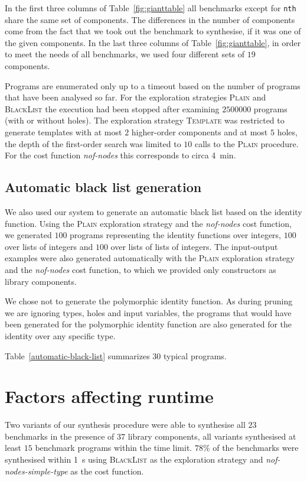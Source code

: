 In the first three columns of Table~\ref{fig:gianttable} all benchmarks except for \lstinline?nth? share the same set of components. The differences in the number of components come from the fact that we took out the benchmark to synthesise, if it was one of the given components.
In the last three columns of Table~\ref{fig:gianttable}, in order to meet the needs of all benchmarks, we used four different sets of $19$ components.

Programs are enumerated only up to a timeout based on the number of programs that have been analysed so far. For the exploration strategies \textsc{Plain} and \textsc{BlackList} the execution had been stopped after examining $2500000$ programs (with or without holes). The exploration strategy \textsc{Template} was restricted to generate templates with at most $2$ higher-order components and at most $5$ holes, the depth of the first-order search was limited to $10$ calls to the \textsc{Plain} procedure. For the cost function \textit{nof-nodes} this corresponds to circa \SI{4}{min}.


\subsection{Automatic black list generation}\label{Black list generation}
We also used our system to generate an automatic black list based on the identity function. Using the \textsc{Plain} exploration strategy and the \textit{nof-nodes} cost function, we generated $100$ programs representing the identity functions over integers, $100$ over lists of integers and $100$ over lists of lists of integers. The input-output examples were also generated automatically with the \textsc{Plain} exploration strategy and the \textit{nof-nodes} cost function, to which we provided only constructors as library components.

We chose not to generate the polymorphic identity function. As during pruning we are ignoring types, holes and input variables, the programs that would have been generated for the polymorphic identity function are also generated for the identity over any specific type.

Table~\ref{automatic-black-list} summarizes $30$ typical programs.


\section{Factors affecting runtime}\label{Factors affecting runtime}
Two variants of our synthesis procedure were able to synthesise all $23$ benchmarks in the presence of $37$ library components, all variants synthesised at least $15$ benchmark programs within the time limit. $78\%$ of the benchmarks were synthesised within \SI{1}{s} using \textsc{BlackList} as the exploration strategy and \textit{nof-nodes-simple-type} as the cost function.

